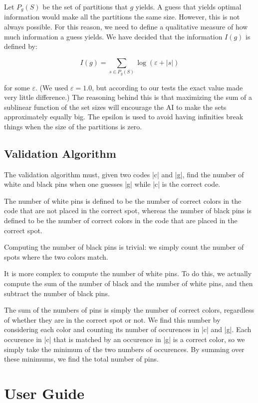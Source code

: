 \documentclass[a4paper]{article}
\begin{document}
Let \(P_g(S)\) be the set of partitions that \(g\) yields. A guess that yields optimal information would make all the partitions the same size. However, this is not always possible. For this reason, we need to define a qualitative measure of how much information a guess yields. We have decided that the information \(I(g)\) is defined by:

\[I(g) = \sum_{s \in P_g(S)}{\log (\varepsilon + |s|)}\]

\noindent for some \(\varepsilon\). (We used \(\varepsilon = 1.0\), but according to our tests the exact value made very little difference.) The reasoning behind this is that maximizing the sum of a sublinear function of the set sizes will encourage the AI to make the sets approximately equally big. The epsilon is used to avoid having infinities break things when the size of the partitions is zero.

\subsection{Validation Algorithm}

The validation algorithm must, given two codes \code|c| and \code|g|, find the number of white and black pins when one guesses \code|g| while \code|c| is the correct code.

The number of white pins is defined to be the number of correct colors in the code that are not placed in the correct spot, whereas the number of black pins is defined to be the number of correct colors in the code that are placed in the correct spot.

Computing the number of black pins is trivial: we simply count the number of spots where the two colors match.

It is more complex to compute the number of white pins. To do this, we actually compute the sum of the number of black and the number of white pins, and then subtract the number of black pins.

The sum of the numbers of pins is simply the number of correct colors, regardless of whether they are in the correct spot or not. We find this number by considering each color and counting its number of occurences in \code|c| and \code|g|. Each occurence in \code|c| that is matched by an occurence in \code|g| is a correct color, so we simply take the minimum of the two numbers of occurences. By summing over these minimums, we find the total number of pins.

\section{User Guide}
\end{document}
